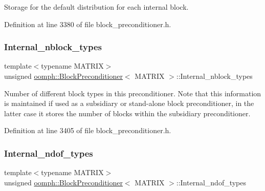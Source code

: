Storage for the default distribution for each internal block. 



Definition at line 3380 of file block\+\_\+preconditioner.\+h.

\mbox{\label{classoomph_1_1BlockPreconditioner_a06c7426a2c8c096c8f4dc583444e0e0e}} 
\subsubsection{\texorpdfstring{Internal\+\_\+nblock\+\_\+types}{Internal\_nblock\_types}}
{\footnotesize\ttfamily template$<$typename M\+A\+T\+R\+IX$>$ \\
unsigned \hyperlink{classoomph_1_1BlockPreconditioner}{oomph\+::\+Block\+Preconditioner}$<$ M\+A\+T\+R\+IX $>$\+::Internal\+\_\+nblock\+\_\+types\hspace{0.3cm}{\ttfamily [protected]}}



Number of different block types in this preconditioner. Note that this information is maintained if used as a subsidiary or stand-\/alone block preconditioner, in the latter case it stores the number of blocks within the subsidiary preconditioner. 



Definition at line 3405 of file block\+\_\+preconditioner.\+h.

\mbox{\label{classoomph_1_1BlockPreconditioner_a3985436e4645c202eadd47a4f4f466e2}} 
\subsubsection{\texorpdfstring{Internal\+\_\+ndof\+\_\+types}{Internal\_ndof\_types}}
{\footnotesize\ttfamily template$<$typename M\+A\+T\+R\+IX$>$ \\
unsigned \hyperlink{classoomph_1_1BlockPreconditioner}{oomph\+::\+Block\+Preconditioner}$<$ M\+A\+T\+R\+IX $>$\+::Internal\+\_\+ndof\+\_\+types\hspace{0.3cm}{\ttfamily [protected]}}



